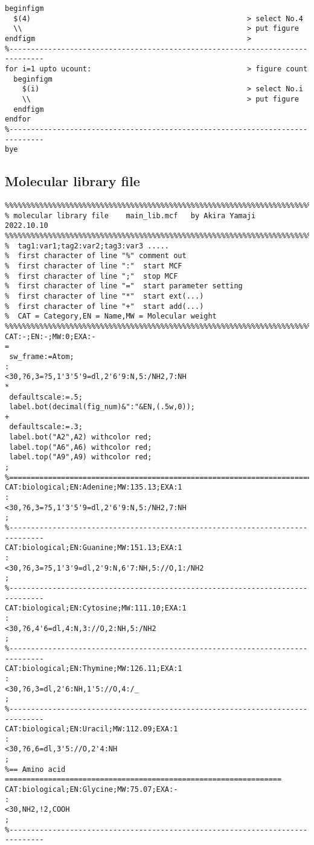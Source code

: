 \documentclass[a4paper]{article}
\begin{document}
\begin{verbatim}
beginfigm
  $(4)                                                  > select No.4
  \\                                                    > put figure
endfigm                                                 >
%------------------------------------------------------------------------------
for i=1 upto ucount:                                    > figure count
  beginfigm
    $(i)                                                > select No.i
    \\                                                  > put figure
  endfigm
endfor
%------------------------------------------------------------------------------
bye
\end{verbatim}
\noindent%
\newpage
\subsection{Molecular library file}
\begin{verbatim}
%%%%%%%%%%%%%%%%%%%%%%%%%%%%%%%%%%%%%%%%%%%%%%%%%%%%%%%%%%%%%%%%%%%%%%%%%%%%%%%
% molecular library file    main_lib.mcf   by Akira Yamaji   2022.10.10
%%%%%%%%%%%%%%%%%%%%%%%%%%%%%%%%%%%%%%%%%%%%%%%%%%%%%%%%%%%%%%%%%%%%%%%%%%%%%%%
%  tag1:var1;tag2:var2;tag3:var3 .....
%  first character of line "%" comment out
%  first character of line ":"  start MCF
%  first character of line ";"  stop MCF
%  first character of line "="  start parameter setting
%  first character of line "*"  start ext(...)
%  first character of line "+"  start add(...)
%  CAT = Category,EN = Name,MW = Molecular weight
%%%%%%%%%%%%%%%%%%%%%%%%%%%%%%%%%%%%%%%%%%%%%%%%%%%%%%%%%%%%%%%%%%%%%%%%%%%%%%%
CAT:-;EN:-;MW:0;EXA:-
=
 sw_frame:=Atom;
:
<30,?6,3=?5,1'3'5'9=dl,2'6'9:N,5:/NH2,7:NH
*
 defaultscale:=.5;
 label.bot(decimal(fig_num)&":"&EN,(.5w,0));
+
 defaultscale:=.3;
 label.bot("A2",A2) withcolor red;
 label.top("A6",A6) withcolor red;
 label.top("A9",A9) withcolor red;
;
%==============================================================================
CAT:biological;EN:Adenine;MW:135.13;EXA:1
:
<30,?6,3=?5,1'3'5'9=dl,2'6'9:N,5:/NH2,7:NH
;
%------------------------------------------------------------------------------
CAT:biological;EN:Guanine;MW:151.13;EXA:1
:
<30,?6,3=?5,1'3'9=dl,2'9:N,6'7:NH,5://O,1:/NH2
;
%------------------------------------------------------------------------------
CAT:biological;EN:Cytosine;MW:111.10;EXA:1
:
<30,?6,4'6=dl,4:N,3://O,2:NH,5:/NH2
;
%------------------------------------------------------------------------------
CAT:biological;EN:Thymine;MW:126.11;EXA:1
:
<30,?6,3=dl,2'6:NH,1'5://O,4:/_
;
%------------------------------------------------------------------------------
CAT:biological;EN:Uracil;MW:112.09;EXA:1
:
<30,?6,6=dl,3'5://O,2'4:NH
;
%== Amino acid ================================================================
CAT:biological;EN:Glycine;MW:75.07;EXA:-
:
<30,NH2,!2,COOH
;
%------------------------------------------------------------------------------
\end{verbatim}
\noindent%
\newpage
\end{document}
